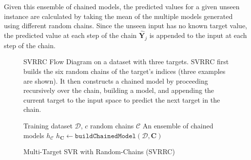 \documentclass[reqno]{vcuthesis}
\numberwithin{equation}{chapter}
\begin{document}
Given this ensemble of chained models, the predicted values for a given unseen instance are calculated by taking the mean of the multiple models generated using different random chains. Since the unseen input has no known target value, the predicted value at each step of the chain $\hat{\bm Y}_j$ is appended to the input at each step of the chain. 
\begin{figure}[t]
\centering \small
\begin{minipage}{\textwidth}
\centering \small
{}
\end{minipage}
\caption{\small SVRRC Flow Diagram on a dataset with three targets. SVRRC first builds the six random chains of the target's indices (three examples are shown). It then constructs a chained model by proceeding recursively over the chain, building a model, and appending the current target to the input space to predict the next target in the chain. } \label{fig:svrrc}
\begin{algorithm}[H]
\caption{Multi-Target SVR with Random-Chains (SVRRC)}
\small \centering
\label{alg:SVRRC} 
\begin{algorithmic}[1]
\renewcommand{\algorithmicrequire}{\textbf{Input:}}
\renewcommand{\algorithmicensure}{\textbf{Output:}}
\Require Training dataset $\mathcal{D}$, $c$ random chains $\mathcal{C}$
\Ensure  An ensemble of chained models $h_\mathcal{C}$
 
\State $h_{\bm C} \leftarrow  \mathtt{build Chained Model} (\mathcal{D},\bm C)$ 
\EndFor 
\end{algorithmic} 
\end{algorithm}
\end{figure}
\end{document}
